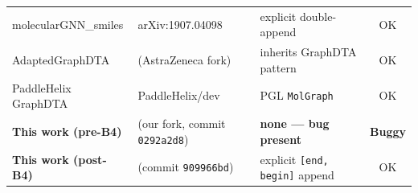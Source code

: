 \begin{table}[t]
\begin{tabular}{lllc}
molecularGNN\_smiles & arXiv:1907.04098 & explicit double-append & OK \\
AdaptedGraphDTA & (AstraZeneca fork) & inherits GraphDTA pattern & OK \\
PaddleHelix GraphDTA & PaddleHelix/dev & PGL \texttt{MolGraph} & OK \\
\midrule
\textbf{This work (pre-B4)} & (our fork, commit \texttt{0292a2d8}) & \textbf{none --- bug present} & \textbf{Buggy} \\
\textbf{This work (post-B4)} & (commit \texttt{909966bd}) & explicit \texttt{[end,\,begin]} append & OK \\
\bottomrule
\end{tabular}
\end{table}
